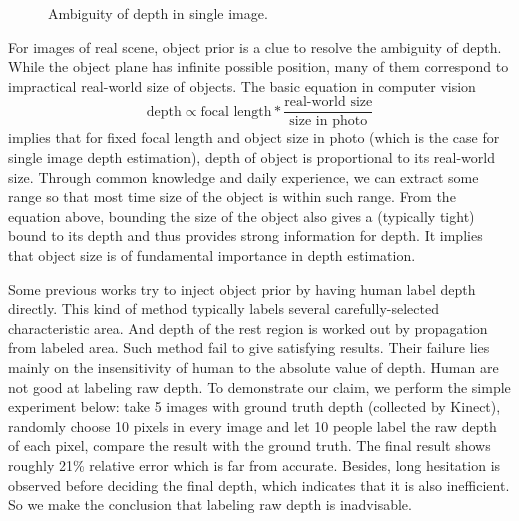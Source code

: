 \documentclass[10pt,twocolumn,letterpaper]{article}
\begin{document}
\begin{figure}[ht]
\begin{center}
\end{center}
   \caption{Ambiguity of depth in single image.}
\label{fig:long}
\label{fig:onecol}
\end{figure}

For images of real scene, object prior is a clue to resolve the ambiguity of depth. While the object plane has infinite possible position, many of them correspond to impractical real-world size of objects. The basic equation in computer vision
\begin{equation}
\text{depth} \propto \text{focal\ length} * \frac{\text{real-world\ size}} {\text{size\ in\ photo}}
\end{equation}
implies that for fixed focal length and object size in photo (which is the case for single image depth estimation), depth of object is proportional to its real-world size. Through common knowledge and daily experience, we can extract some range so that most time size of the object is within such range. From the equation above, bounding the size of the object also gives a (typically tight) bound to its depth and thus provides strong information for depth. It implies that object size is of fundamental importance in depth estimation.

Some previous works try to inject object prior by having human label depth directly. This kind of method typically labels several carefully-selected characteristic area. And depth of the rest region is worked out by propagation from labeled area. Such method fail to give satisfying results. Their failure lies mainly on the insensitivity of human to the absolute value of depth. Human are not good at labeling raw depth. To demonstrate our claim, we perform the simple experiment below: take 5 images with ground truth depth (collected by Kinect), randomly choose 10 pixels in every image and let 10 people label the raw depth of each pixel, compare the result with the ground truth. The final result shows roughly 21\% relative error which is far from accurate. Besides, long hesitation is observed before deciding the final depth, which indicates that it is also inefficient. So we make the conclusion that labeling raw depth is inadvisable.
\end{document}
